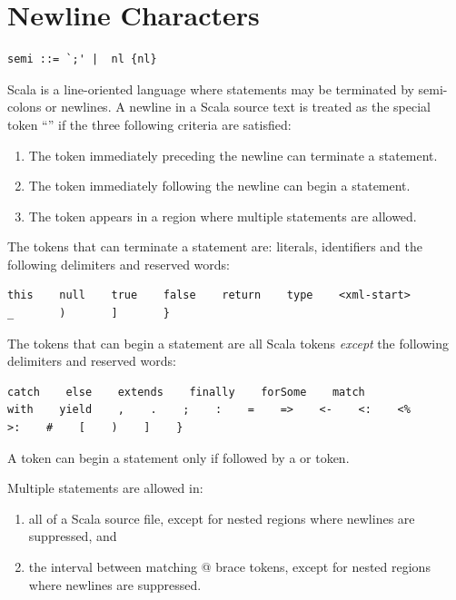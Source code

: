 \section{Newline Characters}\label{sec:newlines}

\syntax\begin{lstlisting}
semi ::= `;' |  nl {nl}
\end{lstlisting}

Scala is a line-oriented language where statements may be terminated by
semi-colons or newlines. A newline in a Scala source text is treated
as the special token ``\lstinline@nl@'' if the three following
criteria are satisfied:
\begin{enumerate}
\item
The token immediately preceding the newline can terminate a statement.
\item
The token immediately following the newline can begin a statement.
\item
The token appears in a region where multiple statements are allowed.
\end{enumerate}

The tokens that can terminate a statement are: literals, identifiers
and the following delimiters and reserved words:
\begin{lstlisting}
this    null    true    false    return    type    <xml-start>    
_       )       ]       }
\end{lstlisting}

The tokens that can begin a statement are all Scala tokens {\em except}
the following delimiters and reserved words:
\begin{lstlisting}
catch    else    extends    finally    forSome    match        
with    yield    ,    .    ;    :    =    =>    <-    <:    <%    
>:    #    [    )    ]    }
\end{lstlisting}
A \lstinline@case@ token can begin a statement only if followed by a
\lstinline@class@ or \lstinline@object@ token.

Multiple statements are allowed in:
\begin{enumerate}
\item
all of a Scala source file, except for nested regions where newlines
are suppressed, and
\item
the interval between matching @ brace tokens,
except for nested regions where newlines are suppressed.
\end{enumerate}

